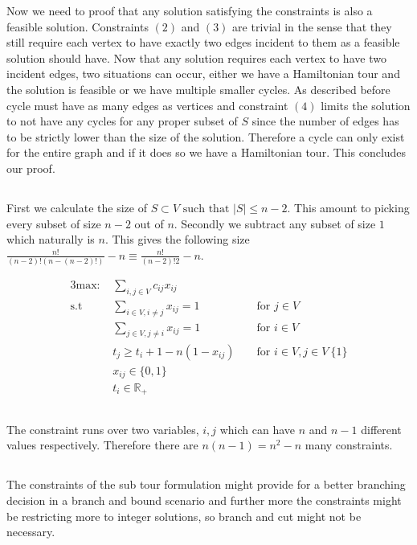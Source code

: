 Now we need to proof that any solution satisfying the constraints is also a feasible solution. Constraints $(2)$ and  $(3)$ are trivial in the sense that they still require each vertex to have exactly two edges incident to them as a feasible solution should have. Now that any solution requires each vertex to have two incident edges, two situations can occur, either we have a Hamiltonian tour and the solution is feasible or we have multiple smaller cycles. As described before cycle must have as many edges as vertices and constraint $(4)$ limits the solution to not have any cycles for any proper subset of $S$ since the number of edges has to be strictly lower than the size of the solution. Therefore a cycle can only exist for the entire graph and if it does so we have a Hamiltonian tour. This concludes our proof.

\subsection{}
First we calculate the size of $S \subset V \text{ such that } |S| \leq n - 2$. This amount to picking every subset of size $n-2$ out of $n$. Secondly we subtract any subset of size $1$ which naturally is $n$. This gives the following size $\frac{n!}{(n-2)! (n - (n-2)!)}-n \equiv \frac{n!}{(n-2)! 2}-n$. 

\begin{alignat}{3}
\text{max: }    & \sum_{i,j \in V} c_{ij} x_{ij}\\
\text{s.t }     & \sum_{i \in V, i \neq j} x_{ij} = 1  && \text{ for } j \in V\\
                & \sum_{j \in V, j \neq i} x_{ij} = 1  && \text{ for } i \in V\\
                & t_j \geq t_i + 1-n(1-x_{ij})  && \text{ for } i \in V, j \in V\ \{1\}\\
                & x_{ij} \in \{0,1\} \\
                & t_i \in \mathbb{R}_+ 
\end{alignat}

\subsection{}
The constraint runs over two variables, $i,j$ which can have $n$ and $n-1$ different values respectively. Therefore there are $n(n-1) = n^2-n$ many constraints.

\subsection{}
The constraints of the sub tour formulation might provide for a better branching decision in a branch and bound scenario and further more the constraints might be restricting more to integer solutions, so branch and cut might not be necessary. 

